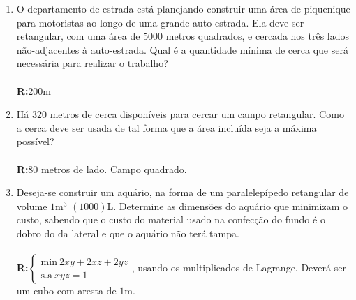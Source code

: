 \documentclass[oneside,a4paper,12pt]{article}
\newcommand{\R}{\\{\bf R:}}
\begin{document}
\begin{enumerate}
\begin{enumerate}
            \item $f(x,y) = x^2+y^2;xy=1$\\\R $f(1,1)=f(-1,-1)=2$
            \item $f(x,y) = x^2-y^2;x^2+y^2=4$ \\\R $f(0,2)=f(0,-2)=-4$
        \end{enumerate}
    \item O departamento de estrada está planejando construir uma área de piquenique para motoristas ao longo de uma grande auto-estrada. Ela deve ser retangular, com uma área de $5000$ metros quadrados, e cercada nos três lados não-adjacentes à auto-estrada. Qual é a quantidade mínima de cerca que será necessária para realizar o trabalho? \\\R $200$m
    \item Há $320$ metros de cerca disponíveis para cercar um campo retangular. Como a cerca deve ser usada de tal forma que a área incluída seja a máxima possível? \\\R $80$ metros de lado. Campo quadrado.
    \item Deseja-se construir um aquário, na forma de um paralelepípedo retangular de volume $1$m$^3$ $(1000)$L. Determine as dimensões do aquário que minimizam o custo, sabendo que o custo do material usado na confecção do fundo é o dobro do da lateral e que o aquário não terá tampa.\\\R $\begin{cases}
    \text{min}~ 2xy+2xz+2yz \\
    \text{s.a}~ xyz=1                                                                                                                                                                                                           
                                                                                                                                                                                                \end{cases}$, usando os multiplicados de Lagrange. Deverá ser um cubo com aresta de $1$m.
                                                                                                                                                                                                
                                                                                                                                                                                                                                                                
                                                                                                                                                                                                                                                                

\end{enumerate}
\end{document}
